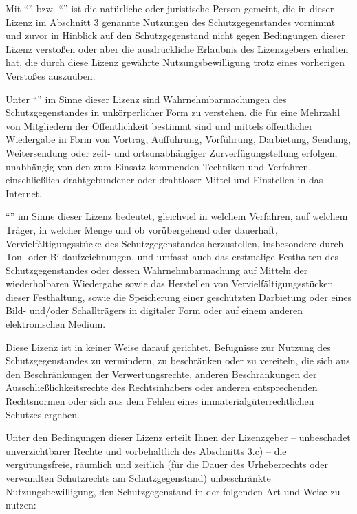 \begin{description}
  Mit \enquote{} bzw. \enquote{} ist die
  natürliche oder juristische Person gemeint, die in
  dieser Lizenz im Abschnitt 3 genannte Nutzungen des
  Schutzgegenstandes vornimmt und zuvor in Hinblick auf
  den Schutzgegenstand nicht gegen Bedingungen dieser
  Lizenz verstoßen oder aber die ausdrückliche Erlaubnis
  des Lizenzgebers erhalten hat, die durch diese Lizenz
  gewährte Nutzungsbewilligung trotz eines vorherigen
  Verstoßes auszuüben.

  Unter \enquote{} im Sinne
  dieser Lizenz sind Wahrnehmbarmachungen des Schutzgegenstandes
  in unkörperlicher Form zu verstehen, die für eine
  Mehrzahl von Mitgliedern der Öffentlichkeit bestimmt
  sind und mittels öffentlicher Wiedergabe in Form von
  Vortrag, Aufführung, Vorführung, Darbietung, Sendung,
  Weitersendung oder zeit- und ortsunabhängiger
  Zurverfügungstellung erfolgen, unabhängig von den zum
  Einsatz kommenden Techniken und Verfahren,
  einschließlich drahtgebundener oder drahtloser Mittel
  und Einstellen in das Internet.

  \enquote{} im Sinne dieser Lizenz
  bedeutet, gleichviel in welchem Verfahren, auf welchem
  Träger, in welcher Menge und ob vorübergehend oder
  dauerhaft, Vervielfältigungsstücke des
  Schutzgegenstandes herzustellen, insbesondere durch Ton-
  oder Bildaufzeichnungen, und umfasst auch das erstmalige
  Festhalten des Schutzgegenstandes oder dessen
  Wahrnehmbarmachung auf Mitteln der wiederholbaren
  Wiedergabe sowie das Herstellen von
  Vervielfältigungsstücken dieser Festhaltung, sowie die
  Speicherung einer geschützten Darbietung oder eines
  Bild- und/oder Schallträgers in digitaler Form oder auf
  einem anderen elektronischen Medium.

  \item[2. Beschränkungen der Verwertungsrechte]
  Diese Lizenz ist in keiner Weise darauf gerichtet,
  Befugnisse zur Nutzung des Schutzgegenstandes zu vermindern,
  zu beschränken oder zu vereiteln, die sich aus den
  Beschränkungen der Verwertungsrechte, anderen Beschränkungen
  der Ausschließlichkeitsrechte des Rechtsinhabers oder
  anderen entsprechenden Rechtsnormen oder sich aus dem Fehlen
  eines immaterialgüterrechtlichen Schutzes ergeben.

  \item[3. Lizenzierung]
  Unter den Bedingungen dieser Lizenz erteilt Ihnen der
  Lizenzgeber -- unbeschadet unverzichtbarer Rechte und
  vorbehaltlich des Abschnitts 3.c) -- die vergütungsfreie,
  räumlich und zeitlich (für die Dauer des Urheberrechts oder
  verwandten Schutzrechts am Schutzgegenstand) unbeschränkte
  Nutzungsbewilligung, den Schutzgegenstand in der folgenden
  Art und Weise zu nutzen:


\end{description}
